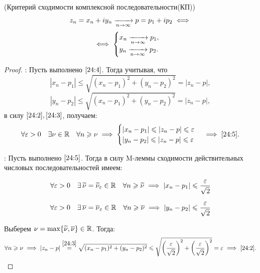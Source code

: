 \documentclass[../../main.tex]{subfiles}
\begin{document}
\begin{thm}(Критерий сходимости комплексной последовательности(КП))
	\begin{equation}\label{24:4}
		z_n = x_n + i y_n \xrightarrow[n \rightarrow \infty]{} p = p_1 + i p_2 \iff
	\end{equation}
	\begin{equation}\label{24:5}
		\iff
		\begin{cases}
			x_n \xrightarrow[n \rightarrow \infty]{} p_1, \\
			y_n \xrightarrow[n \rightarrow \infty]{} p_2.
		\end{cases}
	\end{equation}
\end{thm}
\begin{proof}
\;

	\nec: Пусть выполнено $ \eqref{24:4} $. Тогда учитывая, что
	\[|x_n - p_1| \leq \sqrt{(x_n - p_1)^2 + (y_n - p_2)^2} = |z_n - p|,\]
	\[|y_n - p_2| \leq \sqrt{(x_n - p_1)^2 + (y_n - p_2)^2} = |z_n - p|,\]
	в силу $ \eqref{24:2}, \eqref{24:3} $, получаем:	
	\[\forall \varepsilon > 0\quad \exists \nu \in \mathbb{R}\quad \forall n \geqslant \nu \implies 
	\begin{cases}
		|x_n - p_1| \leqslant |z_n - p| \leqslant \varepsilon \\
		|y_n - p_2| \leqslant |z_n - p| \leqslant \varepsilon \\
	\end{cases} \implies  \eqref{24:5}. \]
	
	\suff: Пусть выполнено $ \eqref{24:5} $. Тогда в силу  M-леммы сходимости 
	действительных числовых последовательностей имеем:
	
	\[\forall \varepsilon > 0 \quad \exists\,\widetilde{\nu} = \widetilde{\nu}_\varepsilon \in 
	\mathbb{R}\quad \forall n \geqslant \widetilde{\nu} \implies 
	|x_n - p_1| \leqslant \frac{\varepsilon}{\sqrt{2}}\]
	
	\[\forall \varepsilon > 0\quad \exists\,\overline{\nu} = \overline{\nu}_\varepsilon \in 
	\mathbb{R}\quad 
	\forall n \geqslant \overline{\nu} \implies 
	|y_n - p_2| \leqslant \frac{\varepsilon}{\sqrt{2}} \]
	
	Выберем $ \nu = \max\{\widetilde{\nu}, \overline{\nu}\} \in \mathbb{R} $. Тогда:
	\[\forall n \geqslant \nu \implies 
	|z_n - p| \stackrel{\eqref{24:3}}{=} \sqrt{(x_n - p_1)^2 + (y_n - p_2)^2} 
	\leqslant \sqrt{\left(\frac{\varepsilon}{\sqrt{2}}\right)^2 + 
	\left(\frac{\varepsilon}{\sqrt{2}}\right)^2} = \varepsilon \implies \eqref{24:2}. \qedhere\]
\end{proof}
\end{document}
